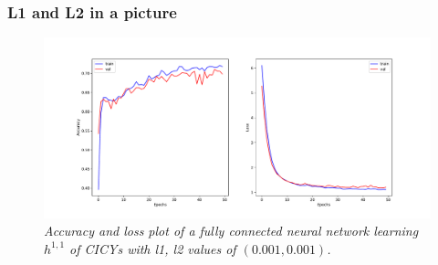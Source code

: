 \documentclass{beamer}
\begin{document}
\begin{frame}
\frametitle{L1 and L2 in a picture}
\begin{figure}
	\centering
	\includegraphics[scale=0.33]{cicy_l1l2_reg.pdf}
	\caption{ \it Accuracy and loss plot of a fully connected neural network learning $h^{1,1}$ of CICYs with l1, l2 values of $(0.001,0.001)$.}
\end{figure}
\end{frame}
\end{document}
